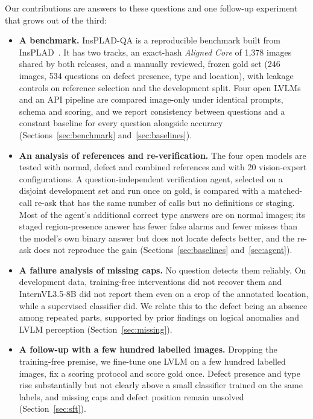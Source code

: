 \documentclass[11pt]{article}
\begin{document}
Our contributions are answers to these questions and one follow-up experiment that grows out of the third:
\begin{itemize}
  \item \textbf{A benchmark.} InsPLAD-QA is a reproducible benchmark built from InsPLAD~\cite{vieira2023insplad}. It has two tracks, an exact-hash \emph{Aligned Core} of 1,378 images shared by both releases, and a manually reviewed, frozen gold set (246 images, 534 questions on defect presence, type and location), with leakage controls on reference selection and the development split. Four open LVLMs and an API pipeline are compared image-only under identical prompts, schema and scoring, and we report consistency between questions and a constant baseline for every question alongside accuracy (Sections~\ref{sec:benchmark} and~\ref{sec:baselines}).
  \item \textbf{An analysis of references and re-verification.} The four open models are tested with normal, defect and combined references and with 20 vision-expert configurations. A question-independent verification agent, selected on a disjoint development set and run once on gold, is compared with a matched-call re-ask that has the same number of calls but no definitions or staging. Most of the agent's additional correct type answers are on normal images; its staged region-presence answer has fewer false alarms and fewer misses than the model's own binary answer but does not locate defects better, and the re-ask does not reproduce the gain (Sections~\ref{sec:baselines} and~\ref{sec:agent}).
  \item \textbf{A failure analysis of missing caps.} No question detects them reliably. On development data, training-free interventions did not recover them and InternVL3.5-8B did not report them even on a crop of the annotated location, while a supervised classifier did. We relate this to the defect being an absence among repeated parts, supported by prior findings on logical anomalies and LVLM perception (Section~\ref{sec:missing}).
  \item \textbf{A follow-up with a few hundred labelled images.} Dropping the training-free premise, we fine-tune one LVLM on a few hundred labelled images, fix a scoring protocol and score gold once. Defect presence and type rise substantially but not clearly above a small classifier trained on the same labels, and missing caps and defect position remain unsolved (Section~\ref{sec:sft}).
\end{itemize}
\end{document}
